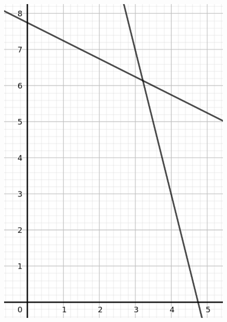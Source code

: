 \documentclass{beamer}
\begin{document}
\begin{frame}
\begin{columns}[T]
\begin{column}{.48\textwidth}
            \includegraphics[width=0.85\textwidth]{images/IP(13).png}
        \end{column}%
        \end{columns}
        

    \end{frame}
    
\end{document}
